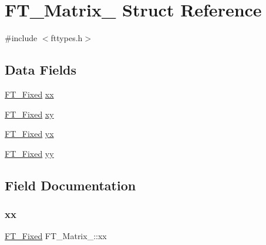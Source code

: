 \hypertarget{struct_f_t___matrix__}{}\section{F\+T\+\_\+\+Matrix\+\_\+ Struct Reference}
\label{struct_f_t___matrix__}


{\ttfamily \#include $<$fttypes.\+h$>$}

\subsection*{Data Fields}
\begin{DoxyCompactItemize}
\item 
\hyperlink{fttypes_8h_a5f5a679cc09f758efdd0d1c5feed3c3d}{F\+T\+\_\+\+Fixed} \hyperlink{struct_f_t___matrix___a27d51c2958634abe7bf377610e095f74}{xx}
\item 
\hyperlink{fttypes_8h_a5f5a679cc09f758efdd0d1c5feed3c3d}{F\+T\+\_\+\+Fixed} \hyperlink{struct_f_t___matrix___a7e9f439d37c00ba1a11919bcaa8937a2}{xy}
\item 
\hyperlink{fttypes_8h_a5f5a679cc09f758efdd0d1c5feed3c3d}{F\+T\+\_\+\+Fixed} \hyperlink{struct_f_t___matrix___a55792583a843a1611b43c40534a02a17}{yx}
\item 
\hyperlink{fttypes_8h_a5f5a679cc09f758efdd0d1c5feed3c3d}{F\+T\+\_\+\+Fixed} \hyperlink{struct_f_t___matrix___a689a6fd20a88238788b90c3597ee0c2a}{yy}
\end{DoxyCompactItemize}


\subsection{Field Documentation}
\mbox{\label{struct_f_t___matrix___a27d51c2958634abe7bf377610e095f74}} 
\subsubsection{\texorpdfstring{xx}{xx}}
{\footnotesize\ttfamily \hyperlink{fttypes_8h_a5f5a679cc09f758efdd0d1c5feed3c3d}{F\+T\+\_\+\+Fixed} F\+T\+\_\+\+Matrix\+\_\+\+::xx}

\mbox{\label{struct_f_t___matrix___a7e9f439d37c00ba1a11919bcaa8937a2}} 
